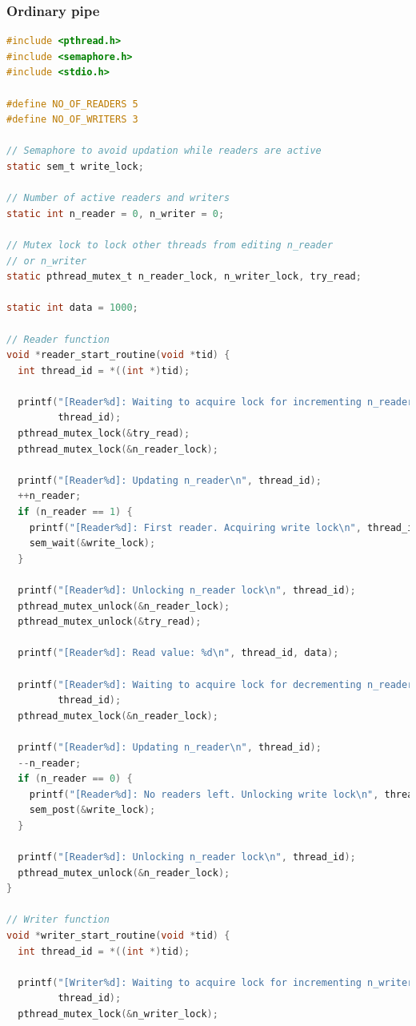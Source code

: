 \subsubsection{Ordinary pipe}
\begin{lstlisting}[language=C]
#include <pthread.h>
#include <semaphore.h>
#include <stdio.h>

#define NO_OF_READERS 5
#define NO_OF_WRITERS 3

// Semaphore to avoid updation while readers are active
static sem_t write_lock;

// Number of active readers and writers
static int n_reader = 0, n_writer = 0;

// Mutex lock to lock other threads from editing n_reader
// or n_writer
static pthread_mutex_t n_reader_lock, n_writer_lock, try_read;

static int data = 1000;

// Reader function
void *reader_start_routine(void *tid) {
  int thread_id = *((int *)tid);

  printf("[Reader%d]: Waiting to acquire lock for incrementing n_reader\n",
         thread_id);
  pthread_mutex_lock(&try_read);
  pthread_mutex_lock(&n_reader_lock);

  printf("[Reader%d]: Updating n_reader\n", thread_id);
  ++n_reader;
  if (n_reader == 1) {
    printf("[Reader%d]: First reader. Acquiring write lock\n", thread_id);
    sem_wait(&write_lock);
  }

  printf("[Reader%d]: Unlocking n_reader lock\n", thread_id);
  pthread_mutex_unlock(&n_reader_lock);
  pthread_mutex_unlock(&try_read);

  printf("[Reader%d]: Read value: %d\n", thread_id, data);

  printf("[Reader%d]: Waiting to acquire lock for decrementing n_reader\n",
         thread_id);
  pthread_mutex_lock(&n_reader_lock);

  printf("[Reader%d]: Updating n_reader\n", thread_id);
  --n_reader;
  if (n_reader == 0) {
    printf("[Reader%d]: No readers left. Unlocking write lock\n", thread_id);
    sem_post(&write_lock);
  }

  printf("[Reader%d]: Unlocking n_reader lock\n", thread_id);
  pthread_mutex_unlock(&n_reader_lock);
}

// Writer function
void *writer_start_routine(void *tid) {
  int thread_id = *((int *)tid);

  printf("[Writer%d]: Waiting to acquire lock for incrementing n_writer\n",
         thread_id);
  pthread_mutex_lock(&n_writer_lock);


\end{lstlisting}
